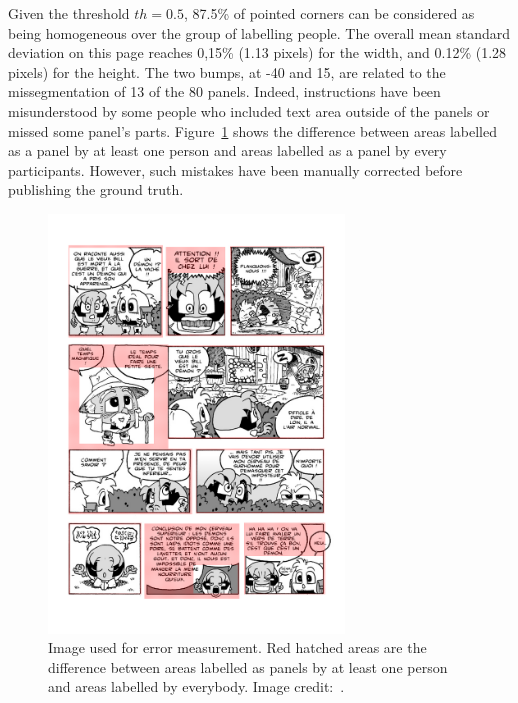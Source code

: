 Given the threshold $th=0.5$, 87.5\% of pointed corners can be considered as being homogeneous over the group of labelling people. 
The overall mean standard deviation on this page reaches 0,15\%
 (1.13 pixels) for the width, and 0.12\% (1.28 pixels) for the height.
The two bumps, at -40 and 15, are related to the missegmentation of 13 of the 80 panels. 
Indeed, instructions have been misunderstood by some people who included text area outside of the panels or missed some panel's parts.
Figure~\ref{fig:gt:diffVT} shows the difference between areas labelled as a panel by at least one person and areas labelled as a panel by every participants.
However, such mistakes have been manually corrected before publishing the ground truth.

\begin{figure}[h!]
\begin{center}
\includegraphics[width=0.7\textwidth]{segDifference.png}
\caption[Image used for ground truth quality assessment]{Image used for error measurement. Red hatched areas are the difference between areas labelled as panels by at least one person and areas labelled by everybody. Image credit:~\cite{Bubble09}.}
\label{fig:gt:diffVT}
\end{center}
\end{figure}

